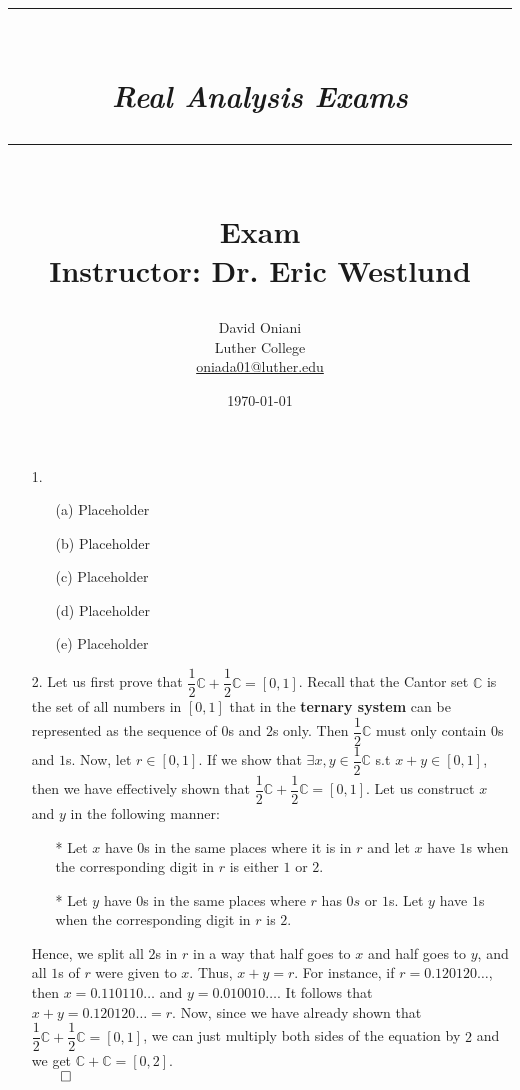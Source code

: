 \documentclass[11pt]{article}
\author{David Oniani\\
        Luther College\\
        \href{mailto:oniada01@luther.edu}{oniada01@luther.edu}}
\title{\rule{\paperwidth - 150pt}{1pt}\textbf{\\\textit{Real Analysis
Exams}\\}\rule {\paperwidth - 150pt}{1pt}\\\textbf{Exam
\textnumero2}\\{\normalsize Instructor: Dr. Eric Westlund}}
\date{\today}
\begin{document}
\maketitle


\begin{itemize}
    \item[1.]
        \begin{itemize}
            \item[(a)]
                Placeholder

            \item[(b)]
                Placeholder

            \item[(c)]
                Placeholder

            \item[(d)]
                Placeholder

            \item[(e)]
                Placeholder
        \end{itemize}

    \item[2.]
        Let us first prove that
        $\dfrac{1}{2}\mathbb{C} + \dfrac{1}{2}\mathbb{C} = [0, 1]$.
        Recall that the Cantor set $\mathbb{C}$ is the set of all numbers in
        $[0, 1]$ that in the \textbf{ternary system} can be represented as the
        sequence of $0$s and $2$s only. Then $\dfrac{1}{2}\mathbb{C}$ must only
        contain $0$s and $1$s. Now, let $r \in [0, 1]$. If we show that $\exists
        x, y \in \dfrac{1}{2}\mathbb{C}$ s.t $x + y \in [0, 1]$, then we have
        effectively shown that
        $\dfrac{1}{2}\mathbb{C} + \dfrac{1}{2}\mathbb{C} = [0, 1]$. Let us
        construct $x$ and $y$ in the following manner:
        \begin{itemize}
            \item[*]
                Let $x$ have $0$s in the same places where it is in $r$ and let
                $x$ have $1$s when the corresponding digit in $r$ is either $1$
                or $2$.

            \item[*]
                Let $y$ have $0$s in the same places where $r$ has $0s$ or
                $1$s. Let $y$ have $1$s when the corresponding digit in $r$ is
                $2$.
        \end{itemize}
        Hence, we split all $2$s in $r$ in a way that half goes to $x$ and half
        goes to $y$, and all $1$s of $r$ were given to $x$. Thus, $x + y = r$.
        For instance, if $r = 0.120120\dots$, then $x = 0.110110\dots$ and $y =
        0.010010\dots$. It follows that $x + y = 0.120120\dots = r$. Now, since
        we have already shown that
        $\dfrac{1}{2}\mathbb{C} + \dfrac{1}{2}\mathbb{C} = [0, 1]$, we can just
        multiply both sides of the equation by $2$ and we get
        $\mathbb{C} + \mathbb{C} = [0, 2]$.\\
        $\qed$


\end{itemize}
\end{document}
